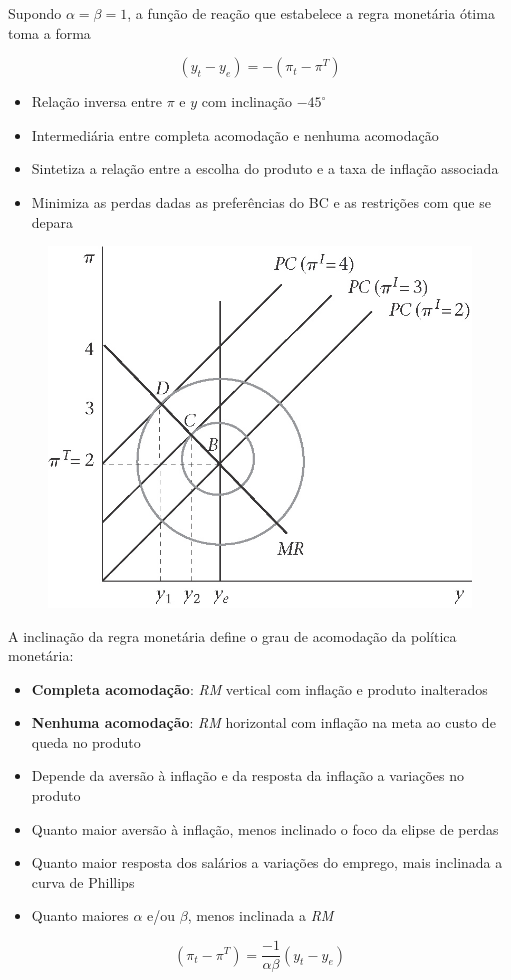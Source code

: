 \documentclass[a4paper,12pt]{article}[abntex2]
\begin{document}
Supondo $\alpha = \beta = 1$, a função de reação que estabelece a regra monetária ótima toma a forma

\[
(y_t - y_e) = - (\pi_t - \pi^T)
\]
\begin{itemize}
    \item  Relação inversa entre $\pi$ e $y$ com inclinação \(-45^\circ\)
    \item  Intermediária entre completa acomodação e nenhuma acomodação
    \item  Sintetiza a relação entre a escolha do produto e a taxa de inflação associada
    \item  Minimiza as perdas dadas as preferências do BC e as restrições com que se depara
\end{itemize}

\begin{figure}[H]
    \centering
    \includegraphics[width=0.5\linewidth]{Imagens/a15i7.png}
\end{figure}


A inclinação da regra monetária define o grau de acomodação da política monetária:\begin{itemize}
    \item  \textbf{Completa acomodação}: \textit{RM} vertical com inflação e produto inalterados
    \item  \textbf{Nenhuma acomodação}: \textit{RM} horizontal com inflação na meta ao custo de queda no produto
    \item  Depende da aversão à inflação e da resposta da inflação a variações no produto
    \item  Quanto maior aversão à inflação, menos inclinado o foco da elipse de perdas
    \item  Quanto maior resposta dos salários a variações do emprego, mais inclinada a curva de Phillips
    \item  Quanto maiores $\alpha$ e/ou $\beta$, menos inclinada a \textit{RM}
\end{itemize}
\[
(\pi_t - \pi^T) = \frac{-1}{\alpha \beta} (y_t - y_e)
\]
\end{document}
